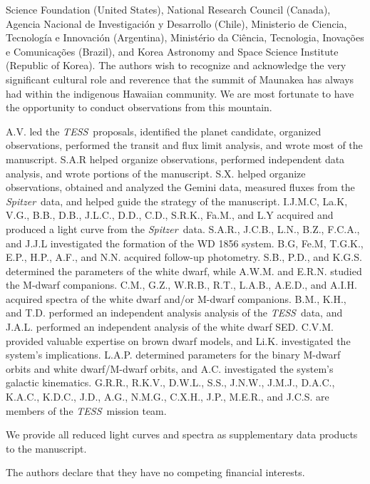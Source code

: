\documentclass{nature3}
\newcommand{\project}[1]{\textsl{#1}}
\newcommand{\Spitzer}{\project{Spitzer}}
\newcommand{\TESS}{\project{TESS}}
\begin{document}
\begin{addendum}
Science Foundation (United States), National Research Council (Canada), Agencia Nacional de Investigaci\'{o}n y Desarrollo (Chile), Ministerio de Ciencia, Tecnolog\'{i}a e Innovaci\'{o}n (Argentina), Minist\'{e}rio da Ci\^{e}ncia, Tecnologia, Inova\c{c}\~{o}es e Comunica\c{c}\~{o}es (Brazil), and Korea Astronomy and Space Science Institute (Republic of Korea). The authors wish to recognize and acknowledge the very significant cultural role and reverence that the summit of Maunakea has always had within the indigenous Hawaiian community.  We are most fortunate to have the opportunity to conduct observations from this mountain.
 
\item[Contributions] A.V. led the \TESS\ proposals, identified the planet candidate, organized observations, performed the transit and flux limit analysis, and wrote most of the manuscript. S.A.R helped organize observations, performed independent data analysis, and wrote portions of the manuscript. S.X. helped organize observations, obtained and analyzed the Gemini data, measured fluxes from the \Spitzer\ data, and helped guide the strategy of the manuscript. I.J.M.C, La.K, V.G., B.B., D.B., J.L.C., D.D., C.D., S.R.K., Fa.M., and L.Y acquired and produced a light curve from the \Spitzer\ data. S.A.R., J.C.B., L.N., B.Z., F.C.A., and J.J.L investigated the formation of the WD 1856 system. B.G, Fe.M, T.G.K., E.P., H.P., A.F., and N.N. acquired follow-up photometry. S.B., P.D., and K.G.S. determined the parameters of the white dwarf, while A.W.M. and E.R.N. studied the M-dwarf companions. C.M., G.Z., W.R.B., R.T., L.A.B., A.E.D., and A.I.H. acquired spectra of the white dwarf and/or M-dwarf companions. B.M.,  K.H., and T.D. performed an independent analysis analysis of the \TESS\ data, and J.A.L. performed an independent analysis of the white dwarf SED. C.V.M. provided valuable expertise on brown dwarf models, and Li.K. investigated the system's implications. L.A.P. determined parameters for the binary M-dwarf orbits and white dwarf/M-dwarf orbits, and A.C. investigated the system's galactic kinematics.  G.R.R., R.K.V., D.W.L., S.S., J.N.W., J.M.J., D.A.C., K.A.C., K.D.C., J.D., A.G., N.M.G., C.X.H., J.P., M.E.R., and J.C.S. are members of the \TESS\ mission team. 

\item[Data Availability] We provide all reduced light curves and spectra as supplementary data products to the manuscript. 

 \item[Competing Interests] The authors declare that they have no competing financial interests.
 

\end{addendum}
\end{document}
